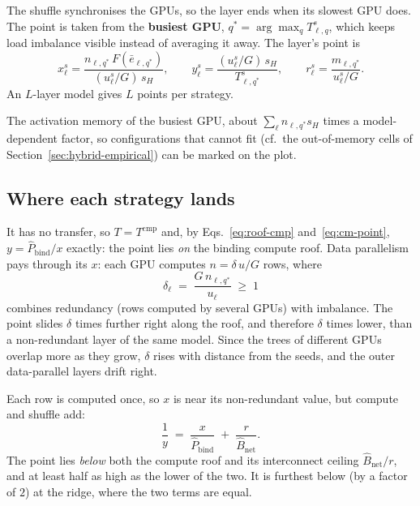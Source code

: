 The shuffle synchronises the GPUs, so the layer ends when its slowest GPU does. The point is
taken from the \textbf{busiest GPU},
$q^{*} = \arg\max_q T^{s}_{\ell,q}$, which keeps load imbalance visible instead of averaging it
away. The layer's point is
\begin{equation}
  x^{s}_\ell = \frac{n_{\ell,q^*}\, F(\bar{e}_{\ell,q^*})}{(u^{s}_\ell/G)\, s_H},
  \qquad
  y^{s}_\ell = \frac{(u^{s}_\ell/G)\, s_H}{T^{s}_{\ell,q^*}},
  \qquad
  r^{s}_\ell = \frac{m_{\ell,q^*}}{u^{s}_\ell/G}.
  \label{eq:cm-point}
\end{equation}
An $L$-layer model gives $L$ points per strategy.

The activation memory of the busiest GPU, about $\sum_\ell n_{\ell,q^*} s_H$ times a
model-dependent factor, so configurations that cannot fit (cf.\ the out-of-memory cells of
Section~\ref{sec:hybrid-empirical}) can be marked on the plot.

\subsection{Where each strategy lands}
\label{sec:cm-strategies}

It has no transfer, so $T = T^{\mathrm{cmp}}$ and, by Eqs.~\eqref{eq:roof-cmp}
and~\eqref{eq:cm-point}, $y = \hat{P}_{\mathrm{bind}}/x$ exactly: the point lies \emph{on} the
binding compute roof. Data parallelism pays through its $x$: each GPU computes
$n = \delta\, u/G$ rows, where
\begin{equation}
  \delta_\ell \;=\; \frac{G\, n_{\ell,q^*}}{u_\ell} \;\ge\; 1
  \label{eq:cm-redundancy}
\end{equation}
combines redundancy (rows computed by several GPUs) with imbalance. The point slides $\delta$
times further right along the roof, and therefore $\delta$ times lower, than a non-redundant
layer of the same model. Since the trees of different GPUs overlap more as they grow, $\delta$
rises with distance from the seeds, and the outer data-parallel layers drift right.

Each row is computed once, so $x$ is near its non-redundant value, but compute and shuffle add:
\begin{equation}
  \frac{1}{y} \;=\; \frac{x}{\hat{P}_{\mathrm{bind}}} \;+\; \frac{r}{\hat{B}_{\mathrm{net}}}.
  \label{eq:cm-gsplit-point}
\end{equation}
The point lies \emph{below} both the compute roof and its interconnect ceiling
$\hat{B}_{\mathrm{net}}/r$, and at least half as high as the lower of the two. It is furthest
below (by a factor of $2$) at the ridge, where the two terms are equal.

